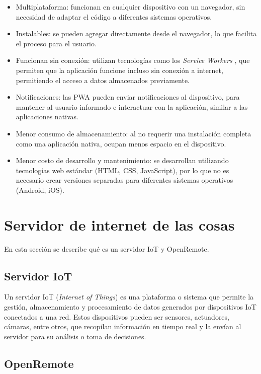 \begin{itemize}
	\item Multiplataforma: funcionan en cualquier dispositivo con un navegador, sin necesidad de adaptar el código a diferentes sistemas operativos.
	\item Instalables: se pueden agregar directamente desde el navegador, lo que facilita el proceso para el usuario.
	\item Funcionan sin conexión: utilizan tecnologías como los \textit{Service Workers} \citep{serviceworker}, que permiten que la aplicación funcione incluso sin conexión a internet, permitiendo el acceso a datos almacenados previamente.
	\item Notificaciones: las PWA pueden enviar notificaciones al dispositivo, para mantener al usuario informado e interactuar con la aplicación, similar a las aplicaciones nativas.
	\item Menor consumo de almacenamiento: al no requerir una instalación completa como una aplicación nativa, ocupan menos espacio en el dispositivo.
	\item Menor costo de desarrollo y mantenimiento: se desarrollan utilizando tecnologías web estándar (HTML, CSS, JavaScript), por lo que no es necesario crear versiones separadas para diferentes sistemas operativos (Android, iOS).
\end{itemize}


\section{Servidor de internet de las cosas}

En esta sección se describe qué es un servidor IoT y OpenRemote.

\subsection{Servidor IoT}
Un servidor IoT (\textit{Internet of Things}) es una plataforma o sistema que permite la gestión, almacenamiento y procesamiento de datos generados por dispositivos IoT conectados a una red. Estos dispositivos pueden ser sensores, actuadores, cámaras, entre otros, que recopilan información en tiempo real y la envían al servidor para su análisis o toma de decisiones.

\subsection{OpenRemote}

